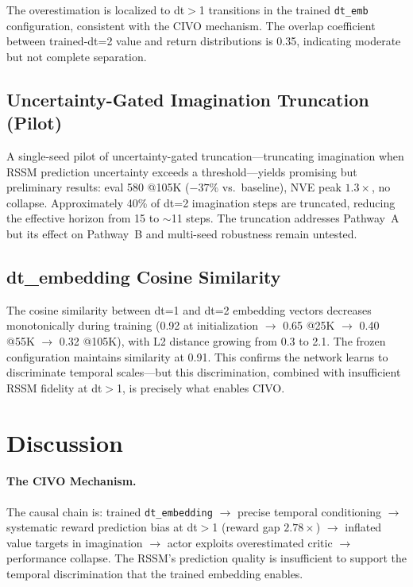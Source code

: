 \documentclass[10pt,letterpaper]{article}
\begin{document}
The overestimation is localized to dt$>$1 transitions in the trained \texttt{dt\_emb} configuration, consistent with the CIVO mechanism.
The overlap coefficient between trained-dt=2 value and return distributions is 0.35, indicating moderate but not complete separation.

\subsection{Uncertainty-Gated Imagination Truncation (Pilot)}
\label{sec:truncation}

A single-seed pilot of uncertainty-gated truncation---truncating imagination when RSSM prediction uncertainty exceeds a threshold---yields promising but preliminary results: eval 580 @105K ($-37\%$ vs.\ baseline), NVE peak $1.3\times$, no collapse.
Approximately 40\% of dt=2 imagination steps are truncated, reducing the effective horizon from 15 to $\sim$11 steps.
The truncation addresses Pathway~A but its effect on Pathway~B and multi-seed robustness remain untested.

\subsection{dt\_embedding Cosine Similarity}
\label{sec:cosine}

The cosine similarity between dt=1 and dt=2 embedding vectors decreases monotonically during training (0.92 at initialization $\rightarrow$ 0.65 @25K $\rightarrow$ 0.40 @55K $\rightarrow$ 0.32 @105K), with L2 distance growing from 0.3 to 2.1.
The frozen configuration maintains similarity at 0.91.
This confirms the network learns to discriminate temporal scales---but this discrimination, combined with insufficient RSSM fidelity at dt$>$1, is precisely what enables CIVO.

\section{Discussion}
\label{sec:discussion}

\paragraph{The CIVO Mechanism.}
The causal chain is: trained \texttt{dt\_embedding} $\rightarrow$ precise temporal conditioning $\rightarrow$ systematic reward prediction bias at dt$>$1 (reward gap $2.78\times$) $\rightarrow$ inflated value targets in imagination $\rightarrow$ actor exploits overestimated critic $\rightarrow$ performance collapse.
The RSSM's prediction quality is insufficient to support the temporal discrimination that the trained embedding enables.
\end{document}
